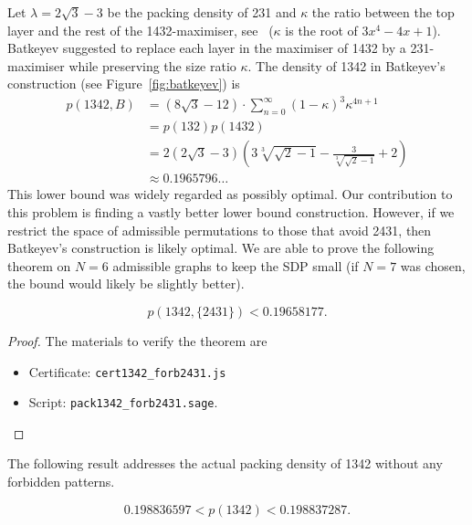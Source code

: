 \documentclass[12pt, a4paper, twoside]{report}
\begin{document}
Let $\lambda = 2\sqrt{3}-3$ be the packing density of 231 and $\kappa$ the ratio between the top layer  and the rest of the 1432-maximiser, see~\cite{price1997packing} ($\kappa$ is the root of $3x^4-4x+1$). Batkeyev suggested to replace each layer in the maximiser of 1432 by a 231-maximiser while preserving the size ratio $\kappa$. The density of 1342 in Batkeyev's construction (see Figure~\ref{fig:batkeyev}) is 
\begin{align*}
p(1342, B) &=(8 \sqrt{3}-12)\cdot \sum _{n=0}^{\infty } (1-\kappa)^3 \kappa ^{4n+1} \\
           &= p(132)p(1432)\\
           &= 2 \left(2 \sqrt{3}-3\right) \left(3 \sqrt[3]{\sqrt{2}-1}-\frac{3}{\sqrt[3]{\sqrt{2}-1}}+2\right)\\
           &\approx 0.1965796\ldots
\end{align*}
This lower bound was widely regarded as possibly optimal. Our contribution to this problem is finding a vastly better lower bound construction. However, if we restrict the space of admissible permutations to those that avoid 2431, then Batkeyev's construction is likely optimal. We are able to prove the following theorem on $N=6$ admissible graphs to keep the SDP small (if $N=7$ was chosen, the bound would likely be slightly better).

\begin{theorem}
$$p(1342,\{2431\}) < 0.19658177.$$
\end{theorem}
\begin{proof}The materials to verify the theorem are
  \begin{itemize}
  \item Certificate: \texttt{cert1342\_forb2431.js}
  \item Script: \texttt{pack1342\_forb2431.sage}.
  \end{itemize}
\end{proof}

The following result addresses the actual packing density of 1342 without any forbidden patterns.
\begin{theorem}
\label{thm:newbounds1342}
$$0.198836597 < p(1342) < 0.198837287.$$
\end{theorem}
\end{document}
